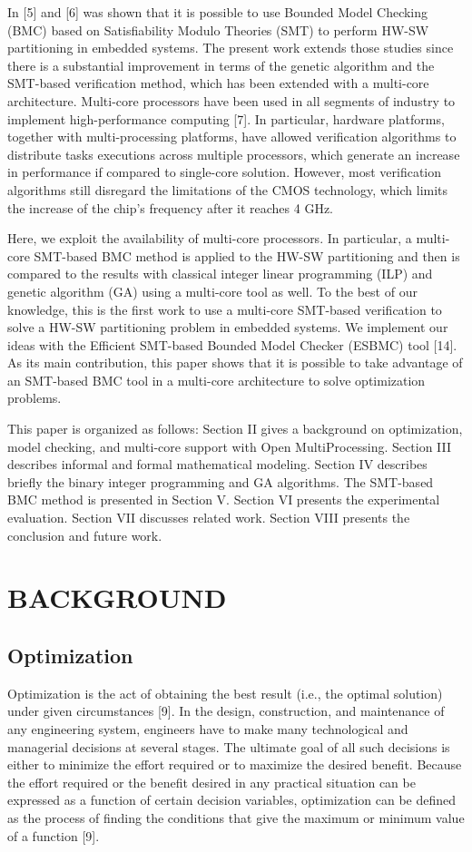 In [5] and [6] was shown that it is possible to use Bounded Model Checking (BMC) based on Satisfiability Modulo Theories (SMT) to perform HW-SW partitioning in embedded systems. The present work extends those studies since there is a substantial improvement in terms of the genetic algorithm and the SMT-based verification method, which has been extended with a multi-core architecture. Multi-core processors have been used in all segments of industry to implement high-performance computing [7]. In particular, hardware platforms, together with multi-processing platforms, have allowed verification algorithms to distribute tasks executions across multiple processors, which generate an increase in performance if compared to single-core solution. However, most verification algorithms still disregard the limitations of the CMOS technology, which limits the increase of the chip’s frequency after it reaches 4 GHz.

Here, we exploit the availability of multi-core processors. In particular, a multi-core SMT-based BMC method is applied to the HW-SW partitioning and then is compared to the results with classical integer linear programming (ILP) and genetic algorithm (GA) using a multi-core tool as well. To the best of our knowledge, this is the first work to use a multi-core SMT-based verification to solve a HW-SW partitioning problem in embedded systems. We implement our ideas with the Efficient SMT-based Bounded Model Checker (ESBMC) tool [14]. As its main contribution, this paper shows that it is possible to take advantage of an SMT-based BMC tool in a multi-core architecture to solve optimization problems.

This paper is organized as follows: Section II gives a background on optimization, model checking, and multi-core support with Open MultiProcessing. Section III describes informal and formal mathematical modeling. Section IV describes briefly the binary integer programming and GA algorithms. The SMT-based BMC method is presented in Section V. Section VI presents the experimental evaluation. Section VII discusses related work. Section VIII presents the conclusion and future work.


\section{BACKGROUND}
\subsection{Optimization}
Optimization is the act of obtaining the best result (i.e., the optimal solution) under given circumstances [9]. In the design, construction, and maintenance of any engineering system, engineers have to make many technological and managerial decisions at several stages. The ultimate goal of all such decisions is either to minimize the effort required or to maximize the desired benefit. Because the effort required or the benefit desired in any practical situation can be expressed as a function of certain decision variables, optimization can be defined as the process of finding the conditions that give the maximum or minimum value of a function [9].

